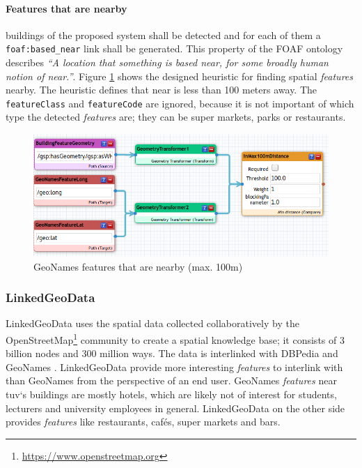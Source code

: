\documentclass[draft,final]{vutinfth} %
\begin{document}
\paragraph{Features that are nearby} buildings of the proposed system shall be detected and for each of them a \texttt{foaf:based\_near} link shall be generated. This property of the FOAF ontology describes \textit{``A location that something is based near, for some broadly human notion of near.''}\cite{brickley_foaf_2012}. Figure \ref{fig:solution-architectural-prototype:ld-management:linking:gnNearBy} shows the designed heuristic for finding spatial \textit{features} nearby. The heuristic defines that near is less than 100 meters away. The \texttt{featureClass} and \texttt{featureCode} are ignored, because it is not important of which type the detected \textit{features} are; they can be super markets, parks or restaurants.

\begin{figure}[h]
    \centering
    \includegraphics[width=1.0\textwidth]{graphics/linking/geonamesFeatureNearByLinking.png}
    \caption{GeoNames features that are nearby (max. 100m)}
    \label{fig:solution-architectural-prototype:ld-management:linking:gnNearBy}
\end{figure}


\subsubsection{LinkedGeoData}
LinkedGeoData uses the spatial data collected collaboratively by the OpenStreetMap\footnote{\url{https://www.openstreetmap.org}} community to create a spatial knowledge base; it consists of 3 billion nodes and 300 million ways. The data is interlinked with DBPedia and GeoNames \cite{universitat_leipzig:_agile_knowledge_engineering_and_semantic_web_linkedgeodata.org_????}. LinkedGeoData provide more interesting \textit{features} to interlink with than GeoNames from the perspective of an end user. GeoNames \textit{features} near \gls{tuv}`s buildings are mostly hotels, which are likely not of interest for students, lecturers and university employees in general. LinkedGeoData on the other side provides \textit{features} like restaurants, cafés, super markets and bars. 
\end{document}
